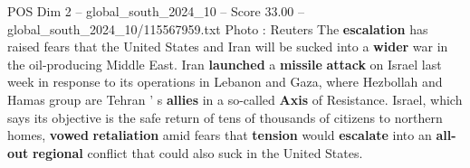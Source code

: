 \begin{textsample}{POS Dim 2 – global\_south\_2024\_10 – Score 33.00 – global\_south\_2024\_10/115567959.txt}
Photo : Reuters The \textbf{escalation} has raised fears that the United States and Iran will be sucked into a \textbf{wider} war in the oil-producing Middle East.
Iran \textbf{launched} a \textbf{missile} \textbf{attack} on Israel last week in response to its operations in Lebanon and Gaza, where Hezbollah and Hamas group are Tehran ' s \textbf{allies} in a so-called \textbf{Axis} of Resistance.
Israel, which says its objective is the safe return of tens of thousands of citizens to northern homes, \textbf{vowed} \textbf{retaliation} amid fears that \textbf{tension} would \textbf{escalate} into an \textbf{all-out} \textbf{regional} conflict that could also suck in the United States.

\end{textsample}
